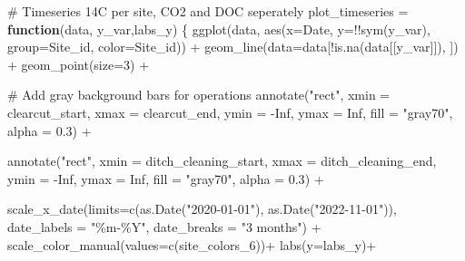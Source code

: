 \documentclass[
  letterpaper,
  DIV=11,
  numbers=noendperiod]{scrartcl}
\newenvironment{Shaded}{\begin{snugshade}}{\end{snugshade}}
\newcommand{\AttributeTok}[1]{\textcolor[rgb]{0.40,0.45,0.13}{#1}}
\newcommand{\CommentTok}[1]{\textcolor[rgb]{0.37,0.37,0.37}{#1}}
\newcommand{\ConstantTok}[1]{\textcolor[rgb]{0.56,0.35,0.01}{#1}}
\newcommand{\ControlFlowTok}[1]{\textcolor[rgb]{0.00,0.23,0.31}{\textbf{#1}}}
\newcommand{\DecValTok}[1]{\textcolor[rgb]{0.68,0.00,0.00}{#1}}
\newcommand{\FloatTok}[1]{\textcolor[rgb]{0.68,0.00,0.00}{#1}}
\newcommand{\FunctionTok}[1]{\textcolor[rgb]{0.28,0.35,0.67}{#1}}
\newcommand{\NormalTok}[1]{\textcolor[rgb]{0.00,0.23,0.31}{#1}}
\newcommand{\OtherTok}[1]{\textcolor[rgb]{0.00,0.23,0.31}{#1}}
\newcommand{\SpecialCharTok}[1]{\textcolor[rgb]{0.37,0.37,0.37}{#1}}
\newcommand{\StringTok}[1]{\textcolor[rgb]{0.13,0.47,0.30}{#1}}
\begin{document}
\begin{Shaded}
\begin{Highlighting}[]
\CommentTok{\# Timeseries 14C per site, CO2 and DOC seperately}
\NormalTok{plot\_timeseries }\OtherTok{=} \ControlFlowTok{function}\NormalTok{(data, y\_var,labs\_y) \{}
  \FunctionTok{ggplot}\NormalTok{(data, }\FunctionTok{aes}\NormalTok{(}\AttributeTok{x=}\NormalTok{Date, }\AttributeTok{y=}\SpecialCharTok{!!}\FunctionTok{sym}\NormalTok{(y\_var), }\AttributeTok{group=}\NormalTok{Site\_id, }\AttributeTok{color=}\NormalTok{Site\_id)) }\SpecialCharTok{+}
    \FunctionTok{geom\_line}\NormalTok{(}\AttributeTok{data=}\NormalTok{data[}\SpecialCharTok{!}\FunctionTok{is.na}\NormalTok{(data[[y\_var]]), ]) }\SpecialCharTok{+}
    \FunctionTok{geom\_point}\NormalTok{(}\AttributeTok{size=}\DecValTok{3}\NormalTok{) }\SpecialCharTok{+}
  
  \CommentTok{\# Add gray background bars for operations}
  \FunctionTok{annotate}\NormalTok{(}\StringTok{"rect"}\NormalTok{, }
           \AttributeTok{xmin =}\NormalTok{ clearcut\_start, }\AttributeTok{xmax =}\NormalTok{ clearcut\_end,}
           \AttributeTok{ymin =} \SpecialCharTok{{-}}\ConstantTok{Inf}\NormalTok{, }\AttributeTok{ymax =} \ConstantTok{Inf}\NormalTok{,}
           \AttributeTok{fill =} \StringTok{"gray70"}\NormalTok{, }\AttributeTok{alpha =} \FloatTok{0.3}\NormalTok{) }\SpecialCharTok{+}
  
  \FunctionTok{annotate}\NormalTok{(}\StringTok{"rect"}\NormalTok{, }
           \AttributeTok{xmin =}\NormalTok{ ditch\_cleaning\_start, }\AttributeTok{xmax =}\NormalTok{ ditch\_cleaning\_end,}
           \AttributeTok{ymin =} \SpecialCharTok{{-}}\ConstantTok{Inf}\NormalTok{, }\AttributeTok{ymax =} \ConstantTok{Inf}\NormalTok{,}
           \AttributeTok{fill =} \StringTok{"gray70"}\NormalTok{, }\AttributeTok{alpha =} \FloatTok{0.3}\NormalTok{) }\SpecialCharTok{+}
    
    \FunctionTok{scale\_x\_date}\NormalTok{(}\AttributeTok{limits=}\FunctionTok{c}\NormalTok{(}\FunctionTok{as.Date}\NormalTok{(}\StringTok{"2020{-}01{-}01"}\NormalTok{), }\FunctionTok{as.Date}\NormalTok{(}\StringTok{"2022{-}11{-}01"}\NormalTok{)),}
                 \AttributeTok{date\_labels =} \StringTok{"\%m{-}\%Y"}\NormalTok{, }\AttributeTok{date\_breaks =} \StringTok{"3 months"}\NormalTok{) }\SpecialCharTok{+}
    \FunctionTok{scale\_color\_manual}\NormalTok{(}\AttributeTok{values=}\FunctionTok{c}\NormalTok{(site\_colors\_6))}\SpecialCharTok{+}
    \FunctionTok{labs}\NormalTok{(}\AttributeTok{y=}\NormalTok{labs\_y)}\SpecialCharTok{+}
    

\end{Highlighting}
\end{Shaded}
\end{document}
